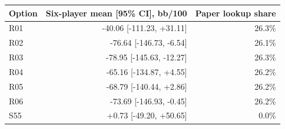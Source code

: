 \begin{tabular}{lrr}
\toprule
Option & Six-player mean [95\% CI], bb/100 & Paper lookup share \\
\midrule
R01 & -40.06 [-111.23, +31.11] & 26.3\% \\
R02 & -76.64 [-146.73, -6.54] & 26.1\% \\
R03 & -78.95 [-145.63, -12.27] & 26.3\% \\
R04 & -65.16 [-134.87, +4.55] & 26.2\% \\
R05 & -68.79 [-140.44, +2.86] & 26.2\% \\
R06 & -73.69 [-146.93, -0.45] & 26.2\% \\
S55 & +0.73 [-49.20, +50.65] & 0.0\% \\
\bottomrule
\end{tabular}
